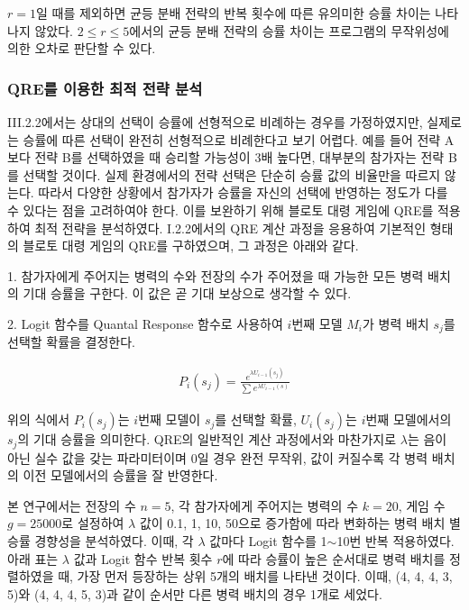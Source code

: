 
$r=1$일 때를 제외하면 균등 분배 전략의 반복 횟수에 따른 유의미한 승률 차이는 나타나지 않았다. $2 \leq r \leq 5$에서의 균등 분배 전략의 승률 차이는 프로그램의 무작위성에 의한 오차로 판단할 수 있다.

\subsubsection{QRE를 이용한 최적 전략 분석}

III.2.2에서는 상대의 선택이 승률에 선형적으로 비례하는 경우를 가정하였지만, 실제로는 승률에 따른 선택이 완전히 선형적으로 비례한다고 보기 어렵다. 예를 들어 전략 A보다 전략 B를 선택하였을 때 승리할 가능성이 3배 높다면, 대부분의 참가자는 전략 B를 선택할 것이다. 실제 환경에서의 전략 선택은 단순히 승률 값의 비율만을 따르지 않는다. 따라서 다양한 상황에서 참가자가 승률을 자신의 선택에 반영하는 정도가 다를 수 있다는 점을 고려하여야 한다. 이를 보완하기 위해 블로토 대령 게임에 QRE를 적용하여 최적 전략을 분석하였다. I.2.2에서의 QRE 계산 과정을 응용하여 기본적인 형태의 블로토 대령 게임의 QRE를 구하였으며, 그 과정은 아래와 같다.

1. 참가자에게 주어지는 병력의 수와 전장의 수가 주어졌을 때 가능한 모든 병력 배치의 기대 승률을 구한다. 이 값은 곧 기대 보상으로 생각할 수 있다.

2. Logit 함수를 Quantal Response 함수로 사용하여 $i$번째 모델 $M_i$가 병력 배치 $s_j$를 선택할 확률을 결정한다.

\begin{align}
    P_i(s_j)= \frac{e^{\lambda U_{i-1}(s_j)}}{\sum_{}^{} e^{\lambda U_{i-1}(s)}}
\end{align}

위의 식에서 $P_i(s_j)$는 $i$번째 모델이 $s_j$를 선택할 확률, $U_i(s_j)$는 $i$번째 모델에서의 $s_j$의 기대 승률을 의미한다. QRE의 일반적인 계산 과정에서와 마찬가지로 $\lambda$는 음이 아닌 실수 값을 갖는 파라미터이며 0일 경우 완전 무작위, 값이 커질수록 각 병력 배치의 이전 모델에서의 승률을 잘 반영한다.

본 연구에서는 전장의 수 $n=5$, 각 참가자에게 주어지는 병력의 수 $k=20$, 게임 수 $g=25000$로 설정하여 $\lambda$ 값이 0.1, 1, 10, 50으로 증가함에 따라 변화하는 병력 배치 별 승률 경향성을 분석하였다. 이때, 각 $\lambda$ 값마다 Logit 함수를 1$\sim$10번 반복 적용하였다. 아래 표는 $\lambda$ 값과 Logit 함수 반복 횟수 $r$에 따라 승률이 높은 순서대로 병력 배치를 정렬하였을 때, 가장 먼저 등장하는 상위 5개의 배치를 나타낸 것이다. 이때, (4, 4, 4, 3, 5)와 (4, 4, 4, 5, 3)과 같이 순서만 다른 병력 배치의 경우 1개로 세었다.

